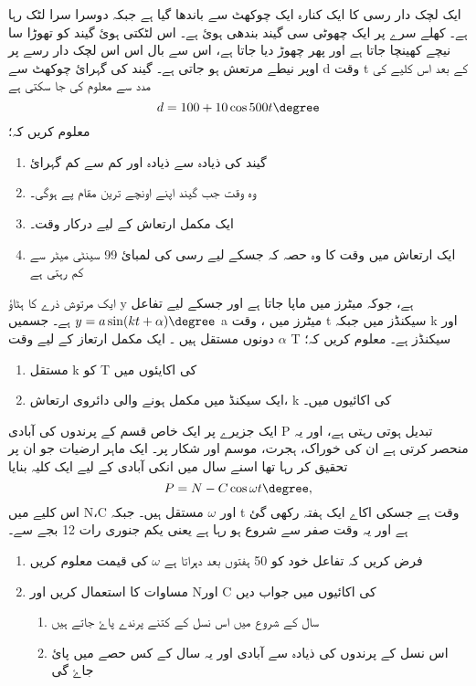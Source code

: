 ایک لچک دار رسی کا ایک کنارہ ایک چوکھٹ سے باندھا گیا ہے جبکہ دوسرا سرا لٹک رہا ہے۔ کھلے سرے پر ایک چھوٹی سی گیند بندھی ہوئ ہے۔ اس لٹکتی ہوئ گیند کو تھوڑا سا نیچے کھینچا جاتا ہے اور پھر چھوڑ دیا جاتا ہے، اس سے بال اس اس لچک دار رسے پر اوپر نیطے مرتعش ہو جاتی ہے۔ گیند کی گہرائ چوکھٹ سے   d وقت t کے بعد اس کلیے کی مدد سے معلوم کی جا سکتی ہے
\[d=100+10\cos500t\degree\]
معلوم کریں کہ؛
\begin{enumerate}
\item   گیند کی ذیادہ سے ذیادہ اور کم سے کم گہرائ
\item  وہ وقت جب گیند اپنے اونچے ترین مقام پے ہوگی۔
\item   ایک مکمل ارتعاش کے لیے درکار وقت۔
\item  ایک ارتعاش میں  وقت کا وہ حصہ کہ جسکے لیے رسی کی لمبائ 99 سینٹی میٹر سے کم رہتی ہے 
\end{enumerate}
ایک مرتوش ذرے کا ہٹاؤ y ہے، جوکہ میٹرز میں ماپا جاتا ہے اور جسکے لیے تفاعل  \(y=a\sin(kt+\alpha)\degree \) ہے۔ جسمیں a میٹرز میں ، وقت t سیکنڈز میں جبکہ k اور \(\alpha \) دونوں مستقل ہیں ۔ ایک مکمل ارتعاز کے لیے وقت   T  سیکنڈز ہے۔
معلوم کریں کہ؛
\begin{enumerate}
\item   مستقل   k کو  T  کی اکایئوں میں
\item   ایک سیکنڈ میں مکمل ہونے والی دائروی ارتعاش،   k کی اکائیوں میں۔
\end{enumerate}


ایک جزیرے پر ایک خاص قسم کے پرندوں کی آبادی P تبدیل ہوتی رہتی ہے، اور یہ منحصر کرتی ہے ان کی خوراک، ہجرت، موسم اور شکار پر۔ ایک ماہر ارضیات جو ان پر تحقیق کر رہا تھا اسنے سال میں انکی آبادی کے لیے ایک کلیہ بنایا  \[P=N-C\cos\omega t\degree, \]
اس کلیے میں N،C اور \(\omega \)   مستقل   ہیں۔ جبکہ   t   وقت ہے جسکی اکاے ایک ہفتہ رکھی گئ ہے اور یہ وقت صفر سے شروع ہو رہا ہے یعنی یکم جنوری رات 12 بجے سے۔
\begin{enumerate}
\item  
   فرض کریں کہ تفاعل خود کو 50 ہفتوں بعد دہراتا ہے   \(\omega \)    کی قیمت معلوم کریں
\item
مساوات کا استعمال کریں اور Nاور  C  کی اکائیوں میں جواب دیں
\begin{enumerate} 
\item 
سال کے شروع میں  اس نسل کے کتنے پرندے پاۓ جاتے ہیں 
\item
اس نسل کے پرندوں کی ذیادہ سے آبادی اور یہ سال کے کس حصے میں پائ جاۓ گی
\end{enumerate}
\end{enumerate}

